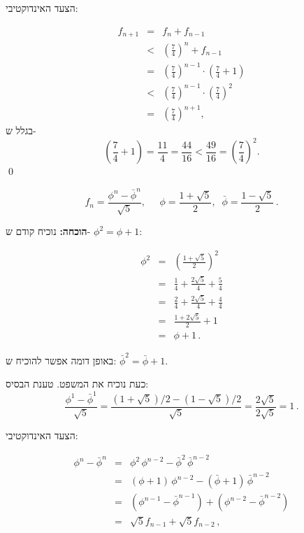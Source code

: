 הצעד האינדוקטיבי:




\begin{eqnarray*}
f_{n+1}&=&f_n+f_{n-1}\\
&<&\left(\frac{7}{4}\right)^n + f_{n-1}\\
&=&\left(\frac{7}{4}\right)^{n-1}\cdot\left(\frac{7}{4}+1\right)\\
&<&\left(\frac{7}{4}\right)^{n-1}\cdot\left(\frac{7}{4}\right)^2\\
&=&\left(\frac{7}{4}\right)^{n+1},
\end{eqnarray*}
בגלל ש-%
\[
\left(\frac{7}{4}+1\right) = \frac{11}{4} = \frac{44}{16}<\frac{49}{16}=\left(\frac{7}{4}\right)^2.
\]
\qed

\begin{theorem}[\L{Binet}]
\begin{displaymath}
f_n = \frac{\phi^n - \bar{\phi}^n}{\sqrt{5}}, \;\;\;\;\;
\phi = \frac{1+\sqrt{5}}{2},\;\;\bar{\phi} = \frac{1-\sqrt{5}}{2}\,.
\end{displaymath}
\end{theorem}



\textbf{הוכחה:}
נוכיח קודם ש-%
$\phi^2=\phi+1$:

\begin{eqnarray*}
\phi^2 &=& \left(\frac{1+\sqrt{5}}{2}\right)^2\\
&=& \frac{1}{4} + \frac{2\sqrt{5}}{4} + \frac{5}{4}\\
&=& \frac{2}{4} + \frac{2\sqrt{5}}{4} + \frac{4}{4}\\
&=& \frac{1+2\sqrt{5}}{2} + 1\\
&=&\phi + 1\,.
\end{eqnarray*}



באופן דומה אפשר להוכיח ש:
$\bar{\phi}^2=\bar{\phi}+1$.

כעת נוכיח את המשפט. טענת הבסיס:
\[
\frac{\phi^1 - \bar{\phi}^1}{\sqrt{5}}=\frac{(1+\sqrt{5})/2-(1-\sqrt{5})/2}{\sqrt{5}}=\frac{2\sqrt{5}}{2\sqrt{5}}=1\,.
\]




הצעד האינדוקטיבי:

\begin{eqnarray*}
\phi^n - \bar{\phi}^n &=& \phi^2\,\phi^{n-2} - \bar{\phi}^2\,\bar{\phi}^{n-2}\\
&=&(\phi+1)\,\phi^{n-2} - (\bar{\phi}+1)\,\bar{\phi}^{n-2}\\
&=&(\phi^{n-1} - \bar{\phi}^{n-1}) + (\phi^{n-2} - \bar{\phi}^{n-2})\\
&=&\sqrt{5}f_{n-1} + \sqrt{5}f_{n-2}\,,
\end{eqnarray*}


